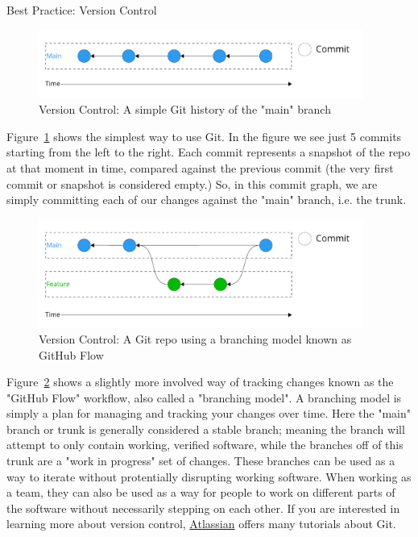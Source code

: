 \documentclass[final]{beamer}
\newlength{\colwidth}
\begin{document}
\begin{frame}[t]
\begin{columns}[t]
\begin{column}{\colwidth}
\begin{block}{Best Practice: Version Control}
    \begin{figure}
      \centering
      \includegraphics[width=0.95\textwidth]{tess2024/git-simple-git-repo.pdf}
      \caption{Version Control: A simple Git history of the "main" branch}
      \label{fig:git-simple}
    \end{figure}

    Figure~\ref*{fig:git-simple} shows the simplest way to use Git.
    In the figure we see just 5 commits starting from the left to the right.
    Each commit represents a snapshot of the repo at that moment in time,
    compared against the previous commit (the very first commit or snapshot
    is considered empty.)
    So, in this commit graph, we are simply committing each of our changes
    against the "main" branch, i.e. the trunk.

    \begin{figure}
      \centering
      \includegraphics[width=0.95\textwidth]{tess2024/git-github-flow.pdf}
      \caption{Version Control: A Git repo using a branching model known as
        GitHub Flow}
      \label{fig:git-github-flow}
    \end{figure}

    Figure~\ref*{fig:git-github-flow} shows a slightly more involved way of
    tracking changes known as the "GitHub Flow" workflow, also called a
    "branching model".
    A branching model is simply a plan for managing and tracking your changes
    over time.
    Here the "main" branch or trunk is generally considered a stable branch;
    meaning the branch will attempt to only contain working, verified software,
    while the branches off of this trunk are a "work in progress" set of
    changes.
    These branches can be used as a way to iterate without protentially
    disrupting working software.
    When working as a team, they can also be used as a way for people to work on
    different parts of the software without necessarily stepping on each other.
    If you are interested in learning more about version control,
    \href{https://www.atlassian.com/git/tutorials/}{Atlassian}\cite{atlassian}
    offers many tutorials about Git.
    

\end{block}
\end{column}
\end{columns}
\end{frame}
\end{document}
